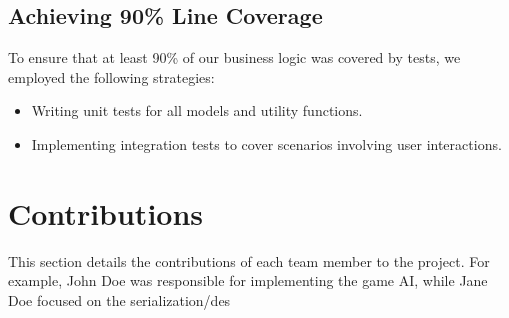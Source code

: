 \documentclass[12pt]{article}
\begin{document}
\subsection{Achieving 90\% Line Coverage}
To ensure that at least 90\% of our business logic was covered by tests, we employed the following strategies:
\begin{itemize}
    \item Writing unit tests for all models and utility functions.
    \item Implementing integration tests to cover scenarios involving user interactions.
\end{itemize}

\section{Contributions}
This section details the contributions of each team member to the project. For example, John Doe was responsible for implementing the game AI, while Jane Doe focused on the serialization/des
\end{document}
